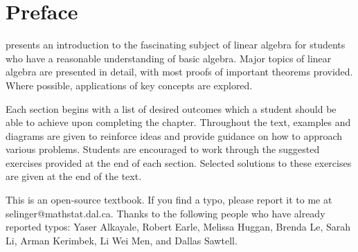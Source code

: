 \chapter*{Preface}

\textit{\bookfulltitle} presents an introduction to the fascinating
subject of linear algebra for students who have a reasonable
understanding of basic algebra. Major topics of linear algebra are
presented in detail, with most proofs of important theorems
provided. Where possible, applications of key concepts are explored.

Each section begins with a list of desired outcomes which a student
should be able to achieve upon completing the chapter.  Throughout the
text, examples and diagrams are given to reinforce ideas and provide
guidance on how to approach various problems. Students are encouraged
to work through the suggested exercises provided at the end of each
section. Selected solutions to these exercises are given at the end of
the text.

This is an open-source textbook. If you find a typo, please report it
to me at selinger@mathstat.dal.ca. Thanks to the following people who
have already reported typos: Yaser Alkayale, Robert Earle, Melissa
Huggan, Brenda Le, Sarah Li, Arman Kerimbek, Li Wei Men, and Dallas
Sawtell.
